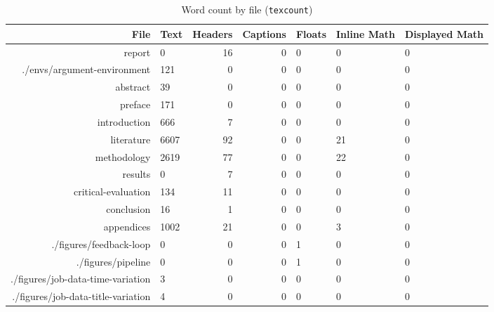 \begin{table}[h]

\centering

\begin{tabularx}{\textwidth}{r X r r X X X}
\textbf{File} & \textbf{Text} & \textbf{Headers} & \textbf{Captions} & \textbf{Floats} & \textbf{Inline Math} & \textbf{Displayed Math} \\
\hline
report & 0 & 16 & 0 & 0 & 0 & 0 \\
./envs/argument-environment & 121 & 0 & 0 & 0 & 0 & 0 \\
abstract & 39 & 0 & 0 & 0 & 0 & 0 \\
preface & 171 & 0 & 0 & 0 & 0 & 0 \\
introduction & 666 & 7 & 0 & 0 & 0 & 0 \\
literature & 6607 & 92 & 0 & 0 & 21 & 0 \\
methodology & 2619 & 77 & 0 & 0 & 22 & 0 \\
results & 0 & 7 & 0 & 0 & 0 & 0 \\
critical-evaluation & 134 & 11 & 0 & 0 & 0 & 0 \\
conclusion & 16 & 1 & 0 & 0 & 0 & 0 \\
appendices & 1002 & 21 & 0 & 0 & 3 & 0 \\
./figures/feedback-loop & 0 & 0 & 0 & 1 & 0 & 0 \\
./figures/pipeline & 0 & 0 & 0 & 1 & 0 & 0 \\
./figures/job-data-time-variation & 3 & 0 & 0 & 0 & 0 & 0 \\
./figures/job-data-title-variation & 4 & 0 & 0 & 0 & 0 & 0 \\
\end{tabularx}
\caption{Word count by file (\texttt{texcount})}
\end{table}
